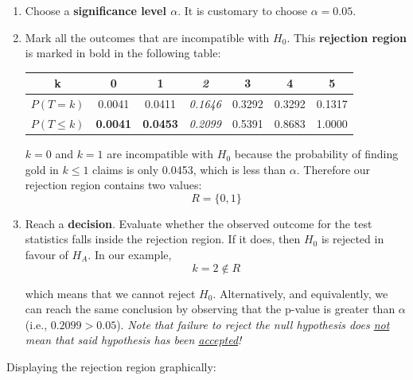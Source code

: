 \begin{enumerate}
\item Choose a \textbf{significance level $\alpha$}. It is customary
  to choose $\alpha=0.05$.

\item\label{it:rejection} Mark all the outcomes that are incompatible
  with $H_0$.  This \textbf{rejection region} is marked in bold in
  the following table:

  \begin{center}
  \begin{tabular}{ccccccc}
    k & \textbf{0} & \textbf{1} & \textit{2} & 3 & 4 & 5 \\ \hline
    $P(T=k)$ & 0.0041 & 0.0411 & \textit{0.1646} & 0.3292 & 0.3292 & 0.1317 \\
    $P({T}\leq{k})$ & \textbf{0.0041} & \textbf{0.0453} &
    \textit{0.2099} & 0.5391 & 0.8683 & 1.0000
  \end{tabular}
  \end{center}

  $k=0$ and $k=1$ are incompatible with $H_0$ because the
  probability of finding gold in $k\leq{1}$ claims is only 0.0453,
  which is less than $\alpha$. Therefore our rejection region contains
  two values:
  \[
  R = \{0,1\}
  \]

\item\label{it:decision} Reach a \textbf{decision}. Evaluate whether
  the observed outcome for the test statistics falls inside the
  rejection region. If it does, then $H_0$ is rejected in favour
  of $H_{\!A}$. In our example,
  \[
  k=2\notin{R}
  \]

  \noindent which means that we cannot reject $H_0$.
  Alternatively, and equivalently, we can reach the same conclusion by
  observing that the p-value is greater than $\alpha$ (i.e.,
  $0.2099>0.05$). \textit{Note that failure to reject the null
    hypothesis does \underline{not} mean that said hypothesis has been
    \underline{accepted}!}\label{pag:notaccepted}
  
\end{enumerate}

Displaying the rejection region graphically:\medskip

